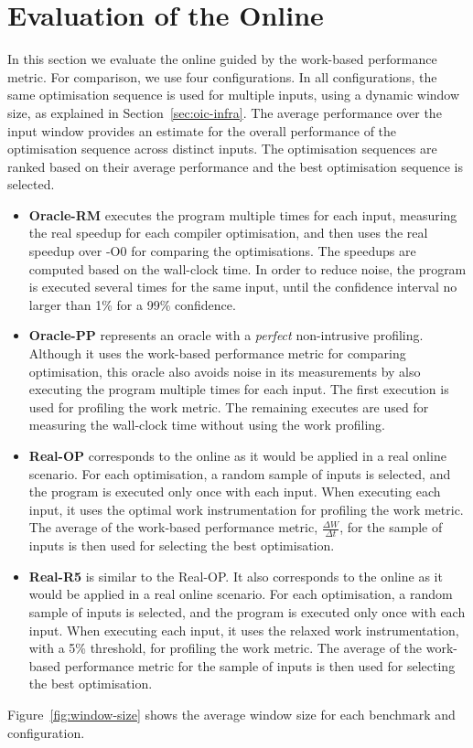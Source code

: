 \section{Evaluation of the Online {\IterComp}}


In this section we evaluate the online {\itercomp} guided by the work-based performance metric.
For comparison, we use four configurations.
In all configurations, the same optimisation sequence is used for multiple inputs, using a dynamic window size, as explained in Section~\ref{sec:oic-infra}.
The average performance over the input window provides an estimate for the overall performance of the optimisation sequence across distinct inputs.
The optimisation sequences are ranked based on their average performance and the best optimisation sequence is selected.
\begin{itemize}
\item \textbf{Oracle-RM} executes the program multiple times for each input, measuring the real speedup for each compiler optimisation, and then uses the real speedup over {\flagstype -O0} for comparing the optimisations.
The speedups are computed based on the wall-clock time.
In order to reduce noise, the program is executed several times for the same input, until the confidence interval no larger than 1\% for a 99\% confidence.
\item \textbf{Oracle-PP} represents an oracle with a \textit{perfect} non-intrusive profiling.
  Although it uses the work-based performance metric for comparing optimisation, this oracle also avoids noise in its measurements by also executing the program multiple times for each input.
  The first execution is used for profiling the work metric.
  The remaining executes are used for measuring the wall-clock time without using the work profiling.
\item \textbf{Real-OP} corresponds to the online {\itercomp} as it would be applied in a real online scenario.
  For each optimisation, a random sample of inputs is selected, and the program is executed only once with each input.
  When executing each input, it uses the optimal work instrumentation for profiling the work metric.
  The average of the work-based performance metric, $\frac{\Delta W}{\Delta t}$, for the sample of inputs is then used for selecting the best optimisation.
\item \textbf{Real-R5} is similar to the {Real-OP}.
  It also corresponds to the online {\itercomp} as it would be applied in a real online scenario.
  For each optimisation, a random sample of inputs is selected, and the program is executed only once with each input.
  When executing each input, it uses the relaxed work instrumentation, with a 5\% threshold, for profiling the work metric.
  The average of the work-based performance metric for the sample of inputs is then used for selecting the best optimisation.
\end{itemize}
Figure~\ref{fig:window-size} shows the average window size for each benchmark and configuration.

